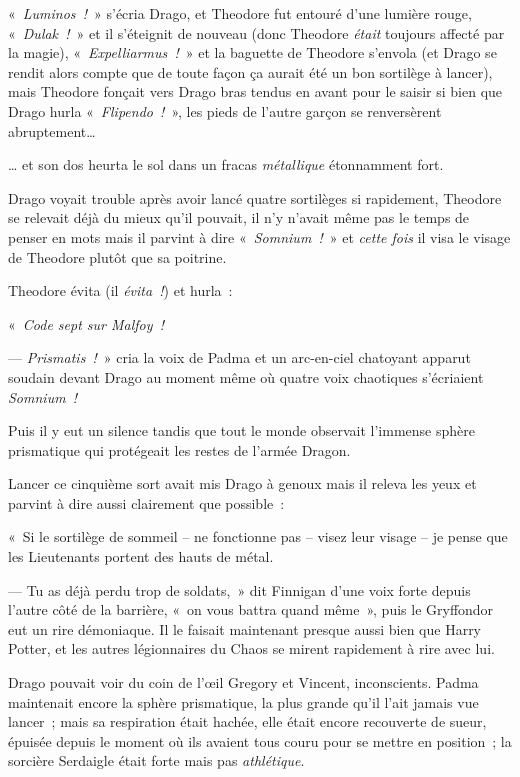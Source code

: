 «~\emph{Luminos~!}~» s'écria Drago, et Theodore fut entouré d'une lumière rouge, «~\emph{Dulak~!}~» et il s'éteignit de nouveau (donc Theodore \emph{était} toujours affecté par la magie), «~\emph{Expelliarmus~!}~» et la baguette de Theodore s'envola (et Drago se rendit alors compte que de toute façon ça aurait été un bon sortilège à lancer), mais Theodore fonçait vers Drago bras tendus en avant pour le saisir si bien que Drago hurla «~\emph{Flipendo~!}~», les pieds de l'autre garçon se renversèrent abruptement…

… et son dos heurta le sol dans un fracas \emph{métallique} étonnamment fort.

Drago voyait trouble après avoir lancé quatre sortilèges si rapidement, Theodore se relevait déjà du mieux qu'il pouvait, il n'y n'avait même pas le temps de penser en mots mais il parvint à dire «~\emph{Somnium~!}~» et \emph{cette fois} il visa le visage de Theodore plutôt que sa poitrine.

Theodore évita (il \emph{évita~!}) et hurla~:

«~\emph{Code sept sur Malfoy~!}

--- \emph{Prismatis~!}~» cria la voix de Padma et un arc-en-ciel chatoyant apparut soudain devant Drago au moment même où quatre voix chaotiques s'écriaient \emph{Somnium~!}

Puis il y eut un silence tandis que tout le monde observait l'immense sphère prismatique qui protégeait les restes de l'armée Dragon.

Lancer ce cinquième sort avait mis Drago à genoux mais il releva les yeux et parvint à dire aussi clairement que possible~:

«~Si le sortilège de sommeil -- ne fonctionne pas -- visez leur visage -- je pense que les Lieutenants portent des hauts de métal.

--- Tu as déjà perdu trop de soldats,~» dit Finnigan d'une voix forte depuis l'autre côté de la barrière, «~on vous battra quand même~», puis le Gryffondor eut un rire démoniaque.
Il le faisait maintenant presque aussi bien que Harry Potter, et les autres légionnaires du Chaos se mirent rapidement à rire avec lui.

Drago pouvait voir du coin de l'œil Gregory et Vincent, inconscients.
Padma maintenait encore la sphère prismatique, la plus grande qu'il l'ait jamais vue lancer~; mais sa respiration était hachée, elle était encore recouverte de sueur, épuisée depuis le moment où ils avaient tous couru pour se mettre en position~; la sorcière Serdaigle était forte mais pas \emph{athlétique}.

